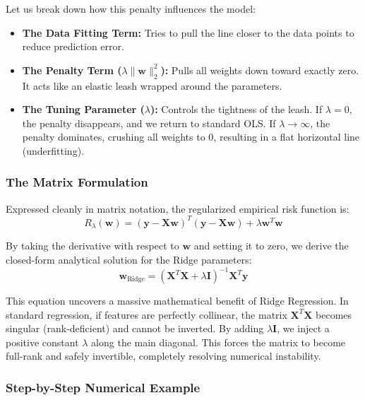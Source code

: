 \documentclass{article}
\begin{document}
Let us break down how this penalty influences the model:
\begin{itemize}
    \item \textbf{The Data Fitting Term:} Tries to pull the line closer to the data points to reduce prediction error.
    \item \textbf{The Penalty Term ($\lambda \|\mathbf{w}\|_2^2$):} Pulls all weights down toward exactly zero. It acts like an elastic leash wrapped around the parameters.
    \item \textbf{The Tuning Parameter ($\lambda$):} Controls the tightness of the leash. If $\lambda = 0$, the penalty disappears, and we return to standard OLS. If $\lambda \to \infty$, the penalty dominates, crushing all weights to $0$, resulting in a flat horizontal line (underfitting).
\end{itemize}

\subsubsection{The Matrix Formulation}
Expressed cleanly in matrix notation, the regularized empirical risk function is:
\begin{equation}
R_\lambda(\mathbf{w}) = (\mathbf{y} - \mathbf{X}\mathbf{w})^T(\mathbf{y} - \mathbf{X}\mathbf{w}) + \lambda \mathbf{w}^T\mathbf{w}
\end{equation}

By taking the derivative with respect to $\mathbf{w}$ and setting it to zero, we derive the closed-form analytical solution for the Ridge parameters:
\begin{equation}
\mathbf{w}_{\text{Ridge}} = (\mathbf{X}^T\mathbf{X} + \lambda \mathbf{I})^{-1}\mathbf{X}^T\mathbf{y}
\end{equation}

This equation uncovers a massive mathematical benefit of Ridge Regression. In standard regression, if features are perfectly collinear, the matrix $\mathbf{X}^T\mathbf{X}$ becomes singular (rank-deficient) and cannot be inverted. By adding $\lambda \mathbf{I}$, we inject a positive constant $\lambda$ along the main diagonal. This forces the matrix to become full-rank and safely invertible, completely resolving numerical instability.

\subsubsection{Step-by-Step Numerical Example}
\end{document}
